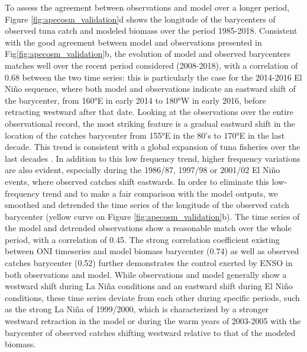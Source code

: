 To assess the agreement between observations and model over a longer period, Figure \ref{fig:apecosm_validation}d shows the longitude of the barycenters of observed tuna catch and modeled biomass over the period 1985-2018. Consistent with the good agreement between model and observations presented in Fig\ref{fig:apecosm_validation}b, the evolution of model and observed barycenters matches well over the recent period considered (2008-2018), with a correlation of 0.68 between the two time series: this is particularly the case for the 2014-2016 El Niño sequence, where both model and observations indicate an eastward shift of the barycenter, from 160°E in early 2014 to 180°W in early 2016, before retracting westward after that date. Looking at the observations over the entire observational record, the most striking feature is a gradual eastward shift in the location of the catches barycenter from 155°E in the 80's to 170°E in the last decade. This trend is
consistent with a global expansion of tuna fisheries over the last decades \citep{coulterUsingHarmonizedHistorical2020}. 
In addition to this low frequency trend, higher frequency variations are also evident, especially during the 1986/87, 1997/98 or 2001/02 El Niño events, where observed catches shift eastwards. In order to eliminate this low-frequency trend and to make a fair comparison with the model outputs, we smoothed and detrended the time series of the longitude of the observed catch barycenter (yellow curve on Figure \ref{fig:apecosm_validation}b). The time series of the model and detrended observations show a reasonable match over the whole period, with a correlation of 0.45. The strong correlation coefficient existing between ONI timeseries and model biomass barycenter (0.74) as well as observed catches barycenter (0.52) further demonstrates the control exerted by ENSO in both observations and model. While observations and model generally show a westward shift during La Niña conditions and an eastward shift during El Niño conditions, these time series deviate from each other during specific periods, such as the strong La Niña of 1999/2000, which is characterized by a stronger westward retraction in the model or during the warm years of 2003-2005 with the barycenter of observed catches shifting westward relative to that of the modeled biomass.


